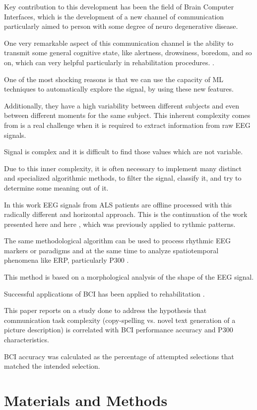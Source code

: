 \documentclass[entropy,article,submit,moreauthors,pdftex,10pt,a4paper]{mdpi}
\begin{document}
Key contribution to this development has been the field of Brain Computer Interfaces, which is the development of a new channel of communication particularly aimed to person with some degree of neuro degenerative disease.

One very remarkable aspect of this communication channel is the ability to transmit some general cognitive state, like alertness, drowsiness, boredom, and so on, which can very helpful particularly in rehabilitation procedures. \citep{Guger2009a}.

One of the most shocking reasons is that we can use the capacity of ML techniques to automatically explore the signal, by using these new features.

Additionally, they have a high variability between different subjects and even between different moments for the same subject.  This inherent complexity comes from  is a real challenge when it is required to extract information from raw EEG signals.

Signal is complex and it is difficult to find those values which are not variable.

Due to this inner complexity, it is often necessary to implement many distinct and specialized algorithmic methods, to filter the signal, classify it, and try to determine some meaning out of it.  

In this work EEG signals from ALS patients are offline processed with this radically different and horizontal approach.  This is the continuation of the work presented here and here \citep{Ramele2016}, which was previously applied to rythmic patterns.

The same methodological algorithm can be used to process rhythmic EEG markers or paradigms and at the same time to analyze spatiotemporal phenomena like ERP, particularly P300 \citep{Ramele2016}.

This method is based on a morphological analysis of the shape of the EEG signal.

Successful applications of BCI has been applied to rehabilitation \citep{Jure2016}.

This paper reports on a study done to address
the hypothesis that communication task complexity
(copy-spelling vs. novel text generation of a picture
description) is correlated with BCI performance accuracy
and P300 characteristics.


BCI accuracy
was calculated as the percentage of attempted selections
that matched the intended selection.

\section{Materials and Methods}
\end{document}
